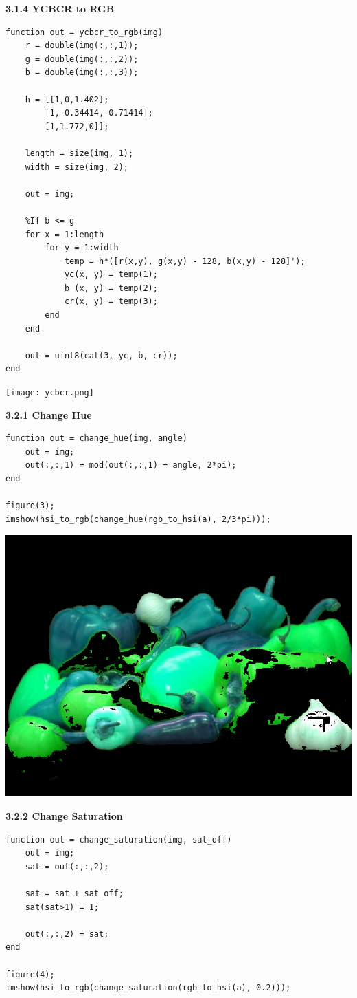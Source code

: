 \documentclass[
]{article}
\begin{document}
\pagebreak

\textbf{3.1.4 YCBCR to RGB}
\begin{verbatim}
function out = ycbcr_to_rgb(img)
    r = double(img(:,:,1));
    g = double(img(:,:,2));
    b = double(img(:,:,3));

    h = [[1,0,1.402];
        [1,-0.34414,-0.71414];
        [1,1.772,0]];
    
    length = size(img, 1);
    width = size(img, 2);
    
    out = img;
    
    %If b <= g
    for x = 1:length
        for y = 1:width
            temp = h*([r(x,y), g(x,y) - 128, b(x,y) - 128]');
            yc(x, y) = temp(1);
            b (x, y) = temp(2);
            cr(x, y) = temp(3);
        end
    end
    
    out = uint8(cat(3, yc, b, cr));
end
\end{verbatim}

\pagebreak

\texttt{[image: ycbcr.png]}

\pagebreak

\textbf{3.2.1 Change Hue}
\begin{verbatim}
function out = change_hue(img, angle) 
    out = img;
    out(:,:,1) = mod(out(:,:,1) + angle, 2*pi);
end

figure(3);
imshow(hsi_to_rgb(change_hue(rgb_to_hsi(a), 2/3*pi)));
\end{verbatim}

\includegraphics[width=0.5\columnwidth]{Change Hue.png}

\pagebreak

\textbf{3.2.2 Change Saturation}
\begin{verbatim}
function out = change_saturation(img, sat_off) 
    out = img;
    sat = out(:,:,2);    
    
    sat = sat + sat_off;
    sat(sat>1) = 1;
    
    out(:,:,2) = sat;
end

figure(4);
imshow(hsi_to_rgb(change_saturation(rgb_to_hsi(a), 0.2)));
\end{verbatim}
\end{document}
